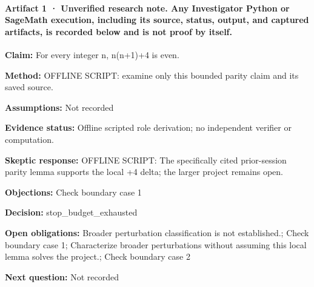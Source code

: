 \documentclass[11pt]{article}
\begin{document}
\paragraph{Artifact 1 · Unverified research note. Any Investigator Python or SageMath execution, including its source, status, output, and captured artifacts, is recorded below and is not proof by itself.}
\textbf{Claim:} For every integer n, n(n+1)+4 is even.\par
\textbf{Method:} OFFLINE SCRIPT: examine only this bounded parity claim and its saved source.\par
\textbf{Assumptions:} Not recorded\par
\textbf{Evidence status:} Offline scripted role derivation; no independent verifier or computation.\par
\textbf{Skeptic response:} OFFLINE SCRIPT: The specifically cited prior-session parity lemma supports the local +4 delta; the larger project remains open.\par
\textbf{Objections:} Check boundary case 1\par
\textbf{Decision:} stop\_budget\_exhausted\par
\textbf{Open obligations:} Broader perturbation classification is not established.; Check boundary case 1; Characterize broader perturbations without assuming this local lemma solves the project.; Check boundary case 2\par
\textbf{Next question:} Not recorded\par
\end{document}
